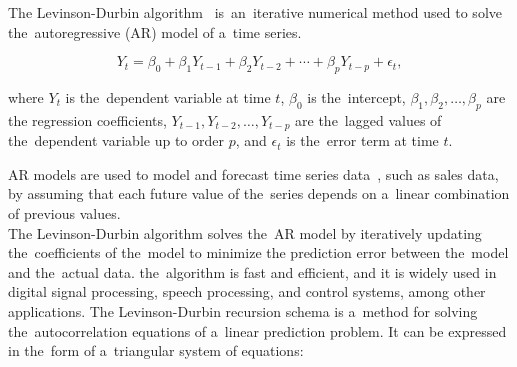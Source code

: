 The Levinson-Durbin algorithm~\cite{Levinson} is~an~iterative numerical method used to solve the~autoregressive
(AR) model of a~time series.

\begin{equation}
    \label{eq:levinson}
    Y_t = \beta_0 + \beta_1 Y_{t-1} + \beta_2 Y_{t-2} + \cdots + \beta_p Y_{t-p} + \epsilon_t,
\end{equation}

where $Y_t$ is the~dependent variable at time $t$, $\beta_0$ is the~intercept, $\beta_1, \beta_2, \dots, \beta_p$ are the
regression coefficients, $Y_{t-1}, Y_{t-2}, \dots, Y_{t-p}$ are the~lagged values of the~dependent variable up to
order $p$, and $\epsilon_t$ is the~error term at time $t$.

AR models are used to model and forecast time series data~\cite{Durbin}, such as sales data, by assuming that each
future value of the~series depends on a~linear combination of previous values.
\\
The Levinson-Durbin algorithm solves the~AR model by iteratively updating the~coefficients of the~model to minimize
the prediction error between the~model and the~actual data. the~algorithm is fast and efficient, and it is widely
used in digital signal processing, speech processing, and control systems, among other applications.
The Levinson-Durbin recursion schema is a~method for solving the~autocorrelation equations of a~linear
prediction problem. It can be expressed in the~form of a~triangular system of equations:

